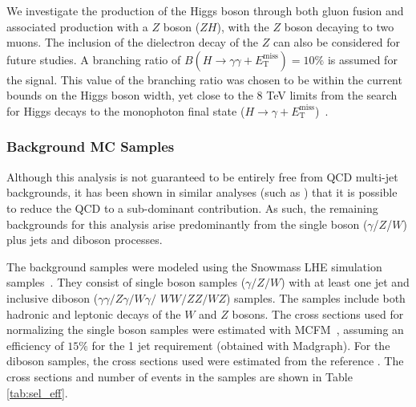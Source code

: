 \documentclass[11pt]{article}
\newcommand{\MET}{\ensuremath{E_{\mathrm{T}}^{\mathrm{miss}}}\xspace}
\begin{document}
We investigate the production of the Higgs boson through both gluon fusion and associated production with a $Z$ boson ($ZH$), with the $Z$ boson decaying to two muons. The inclusion of the dielectron decay of the $Z$ can also be considered for future studies.
%
A branching ratio of ${B}(H\to\gamma\gamma+\MET) = 10\%$ is assumed for the signal. This value of the branching ratio was chosen to be within the current bounds on the Higgs boson width, yet close to the 8 TeV limits from the search for Higgs decays to the monophoton final state ($H\to\gamma+\MET$)~\cite{low-monophoton}.


\subsubsection{Background MC Samples}

Although this analysis is not guaranteed to be entirely free from QCD multi-jet backgrounds, it has been shown in similar analyses (such as \cite{low-monophoton}) that it is possible to reduce the QCD to a sub-dominant contribution. As such, the remaining backgrounds for this analysis arise predominantly from the single boson ($\gamma$/$Z$/$W$) plus jets and diboson processes.

The background samples were modeled using the Snowmass LHE simulation samples~\cite{Anderson:2013kxz}. They consist of single boson samples ($\gamma/Z/W$) with at least one jet and inclusive diboson ($\gamma\gamma/Z\gamma/W\gamma/$ $WW/ZZ/WZ$) samples. The samples include both hadronic and leptonic decays of the $W$ and $Z$ bosons. The cross sections used for normalizing the single boson samples were estimated with MCFM~\cite{mcfm}, assuming an efficiency of $15\%$ for the 1 jet requirement (obtained with Madgraph). For the diboson samples, the cross sections used were estimated from the reference \cite{Campbell:2011bn}. The cross sections and number of events in the samples are shown in Table \ref{tab:sel_eff}.

\end{document}
